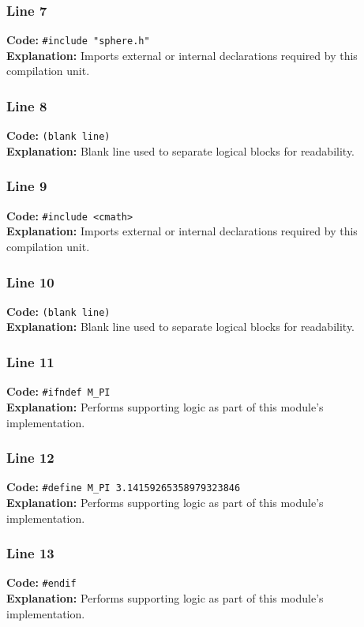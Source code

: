 \documentclass[11pt,a4paper]{article}
\begin{document}
\subsubsection*{Line 7}
\textbf{Code:} \verb|#include "sphere.h"|\\
\textbf{Explanation:} Imports external or internal declarations required by this compilation unit.

\subsubsection*{Line 8}
\textbf{Code:} \texttt{(blank line)}\\
\textbf{Explanation:} Blank line used to separate logical blocks for readability.

\subsubsection*{Line 9}
\textbf{Code:} \verb|#include <cmath>|\\
\textbf{Explanation:} Imports external or internal declarations required by this compilation unit.

\subsubsection*{Line 10}
\textbf{Code:} \texttt{(blank line)}\\
\textbf{Explanation:} Blank line used to separate logical blocks for readability.

\subsubsection*{Line 11}
\textbf{Code:} \verb|#ifndef M_PI|\\
\textbf{Explanation:} Performs supporting logic as part of this module's implementation.

\subsubsection*{Line 12}
\textbf{Code:} \verb|#define M_PI 3.14159265358979323846|\\
\textbf{Explanation:} Performs supporting logic as part of this module's implementation.

\subsubsection*{Line 13}
\textbf{Code:} \verb|#endif|\\
\textbf{Explanation:} Performs supporting logic as part of this module's implementation.
\end{document}
